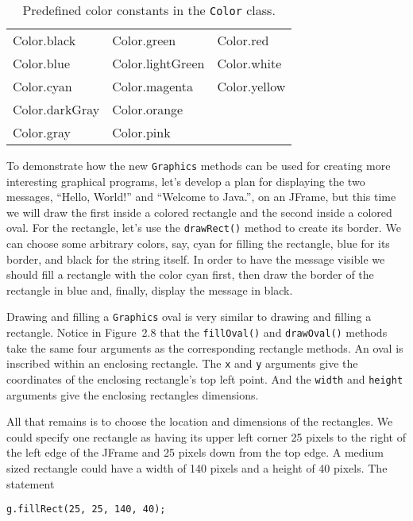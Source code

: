\begin{center}
\begin{table}[h]
\centering
\begin{tabular}{|l|l|l|} \hline
  Color.black & Color.green  & Color.red \\
  Color.blue & Color.lightGreen  & Color.white \\
  Color.cyan & Color.magenta  & Color.yellow \\
  Color.darkGray & Color.orange  &  \\
  Color.gray & Color.pink  &  \\ \hline
\end{tabular}
\caption{Predefined color constants in the {\tt Color} class.}
\label{table-colors}
\end{table}
\end{center}

To demonstrate how the new {\tt Graphics} methods can be used for
creating more interesting graphical programs, let's develop a plan for displaying
the two messages, ``Hello, World!'' and ``Welcome to Java.'', on an
JFrame, but this time we will draw the first inside a colored
rectangle and the second inside a colored oval. For the rectangle,
let's use the {\tt drawRect()} method to create its border.  We can
choose some arbitrary colors, say, cyan for filling the rectangle,
blue for its border, and black for the string itself. In order to have the
message visible we should fill a rectangle with the color cyan first,
then draw the border of the rectangle in blue and, finally, display
the message in black.

Drawing and filling a {\tt Graphics} oval is very similar to drawing
and filling a rectangle. Notice in Figure~2.8 that the
{\tt fillOval()} and {\tt drawOval()} methods take the same four
arguments as the corresponding rectangle methods.  An oval is
inscribed within an enclosing rectangle. The {\tt x} and {\tt y}
arguments give the coordinates of the enclosing rectangle's top left
point. And the {\tt width} and {\tt height} arguments give the
enclosing rectangles dimensions.

All that remains is to choose the location and dimensions of the
rectangles.  We could specify one rectangle as having its upper left
corner 25 pixels to the right of the left edge of the JFrame
and 25 pixels down from the top edge.  A medium sized rectangle could
have a width of 140 pixels and a height of 40 pixels.  The statement
\begin{jjjlisting}
\begin{lstlisting}
g.fillRect(25, 25, 140, 40);
\end{lstlisting}
\end{jjjlisting}

